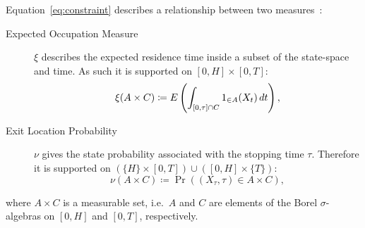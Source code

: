 Equation~\eqref{eq:constraint}  describes a relationship between
two measures~\parencite[][Chapter~9.2]{lasserre2010moments}:
\begin{description}
\item[Expected Occupation Measure] $\xi$ describes the expected residence time inside a subset of the state-space and time. As such it is supported on $[0,H]\times [0,T]$:
\begin{equation}\label{eq:ex_occ_measure}
    \xi(A\times C) \coloneqq {E}\left(\int_{[0,\tau]\cap {C}}{1}_{\in A}(X_t)\,dt\right),
\end{equation}
\item [Exit Location Probability] $\nu$ gives the state probability associated with the stopping time $\tau$. Therefore it is supported on $(\{H\}\times[0,T]) \cup
([0,H]\times\{T\})$:
\begin{equation}\label{eq:exit_loc_measure}
    \nu(A\times C)\coloneqq \Pr((X_{\tau},\tau)\in A\times C),
\end{equation}
\end{description}
where $A\times C$ is a measurable set, i.e.\ $A$ and $C$ are elements of the Borel $\sigma$-algebras on $[0,H]$ and $[0,T]$, respectively.

